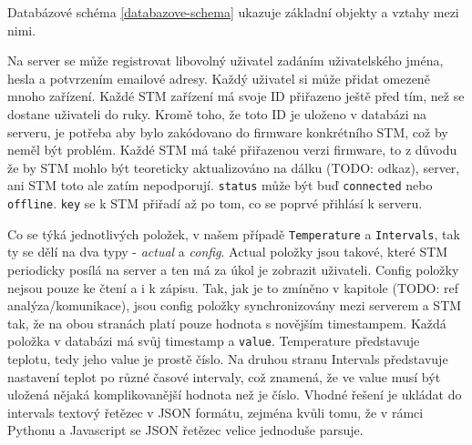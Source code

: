 Databázové schéma \ref{databazove-schema} ukazuje základní objekty a vztahy mezi nimi.

Na server se může registrovat libovolný uživatel zadáním uživatelského jména, hesla a potvrzením
emailové adresy.
Každý uživatel si může přidat omezeně mnoho zařízení.
Každé STM zařízení má svoje ID přiřazeno ještě před tím, než se dostane uživateli do ruky.
Kromě toho, že toto ID je uloženo v databázi na serveru, je potřeba aby bylo zakódovano do firmware
konkrétního STM, což by neměl být problém.
Každé STM má také přiřazenou verzi firmware, to z důvodu že by STM mohlo být teoreticky aktualizováno
na dálku (TODO: odkaz), server, ani STM toto ale zatím nepodporují.
\texttt{status} může být buď \texttt{connected} nebo \texttt{offline}.
\texttt{key} se k STM přiřadí až po tom, co se poprvé přihlásí k serveru.

Co se týká jednotlivých položek, v našem případě \texttt{Temperature} a \texttt{Intervals}, tak ty se
dělí na dva typy - \emph{actual} a \emph{config}.
Actual položky jsou takové, které STM periodicky posílá na server a ten má za úkol je zobrazit uživateli.
Config položky nejsou pouze ke čtení a i k zápisu.
Tak, jak je to zmíněno v kapitole (TODO: ref analýza/komunikace), jsou config položky synchronizovány mezi
serverem a STM tak, že na obou stranách platí pouze hodnota s novějším timestampem.
Každá položka v databázi má svůj timestamp a \texttt{value}.
Temperature představuje teplotu, tedy jeho value je prostě číslo.
Na druhou stranu Intervals představuje nastavení teplot po různé časové intervaly, což znamená, že ve
value musí být uložená nějaká komplikovanější hodnota než je číslo.
Vhodné řešení je ukládat do intervals textový řetězec v JSON formátu, zejména kvůli tomu, že v rámci
Pythonu a Javascript se JSON řetězec velice jednoduše parsuje.


